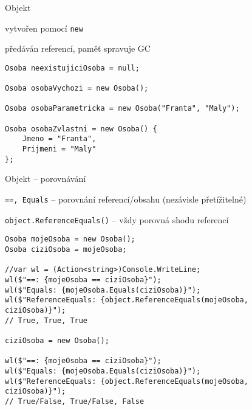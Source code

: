 



\begin{frame}[fragile]
\begin{bitemize}{Objekt}
\item vytvořen pomocí \lstinline|new|
\item předáván referencí, paměť spravuje GC
\end{bitemize}

\begin{yesblock}
\begin{lstlisting}
Osoba neexistujiciOsoba = null;

Osoba osobaVychozi = new Osoba();

Osoba osobaParametricka = new Osoba("Franta", "Maly");

Osoba osobaZvlastni = new Osoba() {
	Jmeno = "Franta",
	Prijmeni = "Maly"
};
\end{lstlisting}
\end{yesblock}
\end{frame}



\begin{frame}[fragile]
\begin{bitemize}{Objekt -- porovnávání}
\item \lstinline|==, Equals| -- porovnání referencí/obsahu (nezávisle přetížitelné)
\item \lstinline|object.ReferenceEquals()| -- vždy porovná shodu referencí
\end{bitemize}
\vskip -3mm
\begin{yesblock}
\begin{lstlisting}[basicstyle=\small]
Osoba mojeOsoba = new Osoba();
Osoba ciziOsoba = mojeOsoba;

//var wl = (Action<string>)Console.WriteLine;
wl($"==: {mojeOsoba == ciziOsoba}");
wl($"Equals: {mojeOsoba.Equals(ciziOsoba)}");
wl($"ReferenceEquals: {object.ReferenceEquals(mojeOsoba, ciziOsoba)}");
// True, True, True

ciziOsoba = new Osoba();

wl($"==: {mojeOsoba == ciziOsoba}");
wl($"Equals: {mojeOsoba.Equals(ciziOsoba)}");
wl($"ReferenceEquals: {object.ReferenceEquals(mojeOsoba, ciziOsoba)}");
// True/False, True/False, False
\end{lstlisting}
\end{yesblock}
\end{frame}




